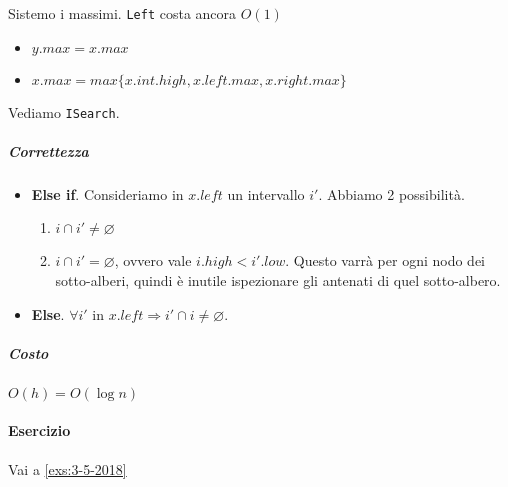 Sistemo i massimi. \texttt{Left} costa ancora $O(1)$
\begin{itemize}[noitemsep]
    \item $y.max = x.max$
    \item $x.max = max \{ x.int.high, x.left.max, x.right.max \}$
\end{itemize}

Vediamo \texttt{ISearch}.
 

\subparagraph{Correttezza} 
\begin{itemize}
    \item \textbf{Else if}. Consideriamo in $x.left$ un intervallo $i'$.
    Abbiamo 2 possibilità.
    \begin{enumerate}[label=($\arabic*$)]
        \item $i \cap i' \neq \varnothing$
        \item $i \cap i' = \varnothing$, ovvero vale $i.high < i'.low$. 
        Questo varrà per ogni nodo dei sotto-alberi, quindi è inutile ispezionare
        gli antenati di quel sotto-albero.
    \end{enumerate}
    \item \textbf{Else}. $\forall i'$ in $x.left \Rightarrow i' \cap i \neq \varnothing$.
\end{itemize}

\subparagraph{Costo} $O(h) = O(\log n)$

\paragraph{Esercizio} Vai a \ref{exs:3-5-2018}